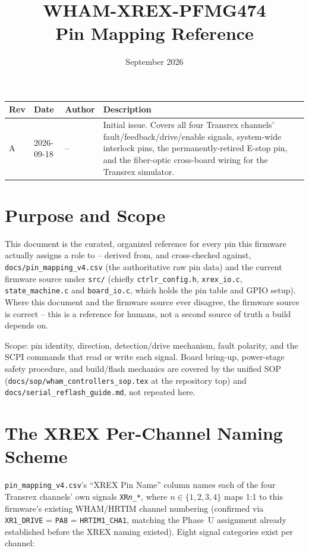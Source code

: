 \documentclass[11pt]{article}
\title{WHAM-XREX-PFMG474\\ \large Pin Mapping Reference}
\author{}
\date{September 2026}
\newcommand{\code}[1]{\texttt{#1}}
\begin{document}
\maketitle

\begin{center}
\begin{tabular}{p{0.45in} p{0.75in} p{0.5in} p{2.7in}}
  \hline
  \textbf{Rev} & \textbf{Date} & \textbf{Author} & \textbf{Description} \\
  \hline
  A & 2026-09-18 & -- & Initial issue. Covers all four Transrex
    channels' fault/feedback/drive/enable signals, system-wide
    interlock pins, the permanently-retired E-stop pin, and the
    fiber-optic cross-board wiring for the Transrex simulator. \\
  \hline
\end{tabular}
\end{center}

\section{Purpose and Scope}
\label{sec:purpose}

This document is the curated, organized reference for every pin this
firmware actually assigns a role to -- derived from, and cross-checked
against, \code{docs/pin\_mapping\_v4.csv} (the authoritative raw pin
data) and the current firmware source under \code{src/} (chiefly
\code{ctrlr\_config.h}, \code{xrex\_io.c}, \code{state\_machine.c} and
\code{board\_io.c}, which holds the pin table and GPIO setup). Where
this document and the firmware source
ever disagree, the firmware source is correct -- this is a reference
for humans, not a second source of truth a build depends on.

Scope: pin identity, direction, detection/drive mechanism, fault
polarity, and the SCPI commands that read or write each signal. Board
bring-up, power-stage safety procedure, and build/flash mechanics are
covered by the unified SOP (\code{docs/sop/wham\_controllers\_sop.tex} at the repository top) and
\code{docs/serial\_reflash\_guide.md}, not repeated here.

\section{The XREX Per-Channel Naming Scheme}
\label{sec:xrex-naming}

\code{pin\_mapping\_v4.csv}'s ``XREX Pin Name'' column names each of
the four Transrex channels' own signals \code{XR\emph{n}\_*}, where
$n \in \{1,2,3,4\}$ maps 1:1 to this firmware's existing WHAM/HRTIM
channel numbering (confirmed via \code{XR1\_DRIVE} = \code{PA8} =
\code{HRTIM1\_CHA1}, matching the Phase~U assignment already
established before the XREX naming existed). Eight signal categories
exist per channel:
\end{document}
